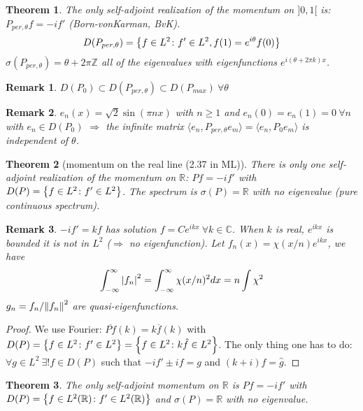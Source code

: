 \documentclass{article}
\newtheorem*{theorem}{Theorem}
\newtheorem*{remark}{Remark}
\newcommand{\ZZ}{\mathbb{Z}}
\newcommand{\RR}{\mathbb{R}}
\newcommand{\CC}{\mathbb{C}}
\newcommand{\sig}{\sigma}
\renewcommand{\sp}[2]{\langle #1,#2 \rangle}
\begin{document}
\begin{theorem} 
  The only self-adjoint realization of the momentum on $]0,1[$ is:
  $P_{per,\theta} f = - i f'$ (Born-vonKarman, BvK).
  $$ D(P_{per,\theta}) = \qty{ f \in L^2 \colon f' \in L^2, f(1) = e^{i \theta} f(0) } $$
  $\sig(P_{per,\theta}) = \theta + 2\pi \ZZ$ all of the eigenvalues with eigenfunctions $e^{i(\theta+2\pi k)x}$.
\end{theorem}

\begin{remark} 
  $D(P_0) \subset D(P_{per,\theta}) \subset D(P_{max}) \ \forall \theta$ 
\end{remark}

\begin{remark}
  $e_n(x) = \sqrt{2} \sin(\pi n x)$ with $n \ge 1$ 
  and $e_n(0) = e_n(1) = 0 \ \forall n$ with $e_n \in D(P_0)$
  $\Rightarrow$ the infinite matrix $\sp{e_n}{P_{per,\theta} e_m} = \sp{e_n}{P_0 e_m}$ is independent of $\theta$.
\end{remark}

\begin{theorem}[momentum on the real line (2.37 in ML)]
  There is only one self-adjoint realization of the momentum on $\RR$:
  $P f = - i f'$ with $D(P) = \qty{ f \in L^2 \colon f' \in L^2 }$. 
  The spectrum is $\sig(P) = \RR$ with no eigenvalue (pure continuous spectrum).
\end{theorem}

\begin{remark}
  $-i f' = k f$ has solution $f = C e^{ikx} \ \forall k \in \CC$. 
  When $k$ is real, $e^{ikx}$ is bounded it is not in $L^2$ ($\Rightarrow$ no eigenfunction).
  Let $f_n(x) = \chi(x/n) e^{ikx}$, we have
  $$\int_{-\infty}^{\infty} \abs{f_n}^2 = \int_{-\infty}^{\infty} \chi(x/n)^2 dx = n \int \chi^2$$
  $g_n = f_n/\norm{f_n}^2$ are quasi-eigenfunctions.
\end{remark}

\begin{proof} 
  We use Fourier: $\overline{P f}(k) = k \overline{f}(k)$
  with $D(P) = \qty{ f \in L^2 \colon f' \in L^2 } = \qty{ f \in L^2 \colon k \hat{f} \in L^2 }$.
  The only thing one has to do:
  $\forall g \in L^2 \ \exists! f \in D(P)$ such that $-i f' \pm i f = g$ and $(k+i) \hat{f} = \hat{g}$.
\end{proof}

\begin{theorem} 
  The only self-adjoint momentum on $\RR$ is
  $P f = -i f'$ with $D(P) = \qty{f \in L^2(\RR) \colon f' \in L^2(\RR) }$
  and $\sig(P) = \RR$ with no eigenvalue.
\end{theorem} 
\end{document}
